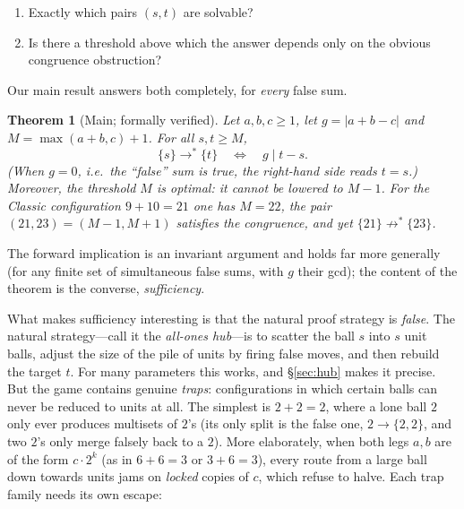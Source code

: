 \documentclass[11pt]{article}
\newtheorem{theorem}{Theorem}[section]
\theoremstyle{definition}
\theoremstyle{remark}
\newcommand{\ms}[1]{\{#1\}}
\newcommand{\reach}{\longrightarrow^{*}}
\begin{document}
\begin{enumerate}
\item[(Q1)] Exactly which pairs $(s,t)$ are solvable?
\item[(Q2)] Is there a threshold above which the answer depends only on the
obvious congruence obstruction?
\end{enumerate}

Our main result answers both completely, for \emph{every} false sum.

\begin{theorem}[Main; formally verified]\label{thm:main-intro}
Let $a,b,c\ge 1$, let $g=|a+b-c|$ and $M=\max(a+b,c)+1$.  For all
$s,t\ge M$,
\[
\ms{s} \reach \ms{t}
\quad\Longleftrightarrow\quad
g \mid t-s .
\]
(When $g=0$, i.e.\ the ``false'' sum is true, the right-hand side reads
$t=s$.)  Moreover, the threshold $M$ is optimal: it cannot be lowered to
$M-1$.  For the Classic configuration $9+10=21$ one has $M=22$, the pair
$(21,23)=(M-1,M+1)$ satisfies the congruence, and yet
$\ms{21}\not\reach\ms{23}$.
\end{theorem}

The forward implication is an invariant argument and holds far more
generally (for any finite set of simultaneous false sums, with $g$ their
gcd); the content of the theorem is the converse, \emph{sufficiency}.

What makes sufficiency interesting is that the natural proof strategy is
\emph{false}.  The natural strategy---call it the \emph{all-ones hub}---is to
scatter the ball $s$ into $s$ unit balls, adjust the size of the pile of
units by firing false moves, and then rebuild the target $t$.  For many
parameters this works, and \S\ref{sec:hub} makes it precise.  But the game
contains genuine \emph{traps}: configurations in which certain balls can
never be reduced to units at all.  The simplest is $2+2=2$, where a lone
ball $2$ only ever produces multisets of $2$'s (its only split is the false
one, $2\to\{2,2\}$, and two $2$'s only merge falsely back to a $2$).  More
elaborately, when both legs $a,b$ are of the form $c\cdot 2^k$ (as in
$6+6=3$ or $3+6=3$), every route from a large ball down towards units jams on
\emph{locked} copies of $c$, which refuse to halve.  Each trap family needs
its own escape:
\end{document}
